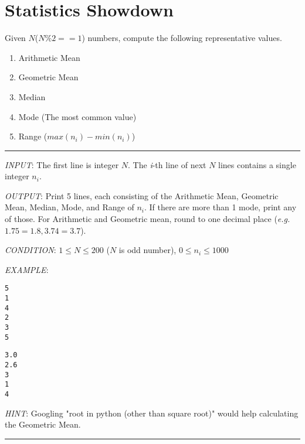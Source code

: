 \documentclass{article}
\begin{document}
\section{Statistics Showdown}
Given $N$($N \% 2 == 1$) numbers, compute the following representative values.
\begin{enumerate}
  \item Arithmetic Mean
  \item Geometric Mean
  \item Median
  \item Mode (The most common value)
  \item Range ($max(n_i) - min(n_i)$)
\end{enumerate}

\noindent\rule{\textwidth}{0.9pt}
\textit{INPUT}: The first line is integer $N$.
The \textit{i}-th line of next $N$ lines contains a single integer $n_{i}$.

\textit{OUTPUT}: Print 5 lines, each consisting of the Arithmetic Mean, Geometric
Mean, Median, Mode, and Range of $n_{i}$. If there are more than 1 mode, print
any of those. For Arithmetic and Geometric mean,
round to one decimal place (\textit{e.g.} $1.75 = 1.8, 3.74 = 3.7$).

\textit{CONDITION}: $ 1 \le N \le 200$ ($N$ is odd number),  $ 0 \le n_{i} \le 1000$

\textit{EXAMPLE}:
\begin{lstlisting}
5
1
4
2
3
5
\end{lstlisting}

\begin{lstlisting}
3.0
2.6
3
1
4
\end{lstlisting}

\textit{HINT}: Googling "root in python (other than square root)" would help
calculating the Geometric Mean.
\noindent\rule{\textwidth}{0.9pt}

\end{document}
